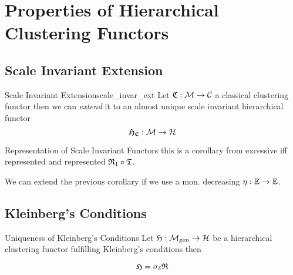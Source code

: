 \chapter{Properties of Hierarchical Clustering Functors}




\section{Scale Invariant Extension}
\todo
\begin{definition}{Scale Invariant Extension}{scale_invar_ext}
Let $\mathfrak{C}: \mathcal{M} \to \mathcal{C}$ a classical clustering functor then we can \emph{extend} it to an almost unique scale invariant hierarchical functor
$$
\mathfrak{H}_{\mathfrak{C}}: \mathcal{M} \to \mathcal{H}
$$
\end{definition}

\begin{corollary}{Representation of Scale Invariant Functors}{}
this is a corollary from excessive iff represented and represented $\mathfrak{R}_1 \circ \mathfrak{T}$.
\end{corollary}

\begin{myremark}{}{}
We can extend the previous corollary if we use a mon. decreasing $\eta: \mathbb E \to \mathbb E$.
\end{myremark}


\section{Kleinberg's Conditions}

\begin{theorem}{Uniqueness of Kleinberg's Conditions}{}
    Let $\mathfrak{H}: {\mathcal{M}_\mathrm{gen}} \to \mathcal{H}$ be a hierarchical clustering functor fulfilling Kleinberg's conditions then

    $$
    \mathfrak{H} = \sigma_\delta \mathfrak{R}
    $$

\end{theorem}